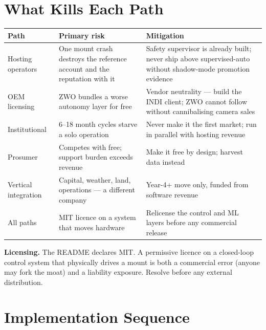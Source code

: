 \documentclass[11pt]{article}
\begin{document}
\section{What Kills Each Path}

\begin{center}
\small
\begin{tabular}{@{}p{3.6cm}p{5.2cm}p{5.2cm}@{}}
\toprule
\textbf{Path} & \textbf{Primary risk} & \textbf{Mitigation} \\
\midrule
Hosting operators & One mount crash destroys the reference account and the reputation with it & Safety supervisor is already built; never ship above supervised-auto without shadow-mode promotion evidence \\
\addlinespace
OEM licensing & ZWO bundles a worse autonomy layer for free & Vendor neutrality --- build the INDI client; ZWO cannot follow without cannibalising camera sales \\
\addlinespace
Institutional & 6--18 month cycles starve a solo operation & Never make it the first market; run in parallel with hosting revenue \\
\addlinespace
Prosumer & Competes with free; support burden exceeds revenue & Make it free by design; harvest data instead \\
\addlinespace
Vertical integration & Capital, weather, land, operations --- a different company & Year-4+ move only, funded from software revenue \\
\addlinespace
All paths & MIT licence on a system that moves hardware & Relicense the control and ML layers before any commercial release \\
\bottomrule
\end{tabular}
\end{center}

\begin{redbox}
\textbf{Licensing.} The README declares MIT. A permissive licence on a
closed-loop control system that physically drives a mount is both a commercial
error (anyone may fork the moat) and a liability exposure. Resolve before any
external distribution.
\end{redbox}

\section{Implementation Sequence}
\end{document}
